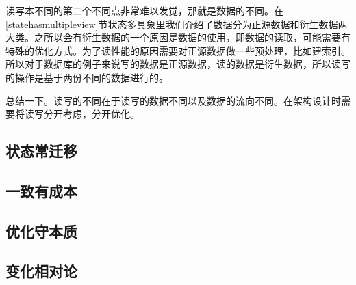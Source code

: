 读写本不同的第二个不同点非常难以发觉，那就是数据的不同。在\ref{statehasmultipleview}节状态多具象里我们介绍了数据分为正源数据和衍生数据两大类。之所以会有衍生数据的一个原因是数据的使用，即数据的读取，可能需要有特殊的优化方式。为了读性能的原因需要对正源数据做一些预处理，比如建索引。所以对于数据库的例子来说写的数据是正源数据，读的数据是衍生数据，所以读写的操作是基于两份不同的数据进行的。


总结一下。读写的不同在于读写的数据不同以及数据的流向不同。在架构设计时需要将读写分开考虑，分开优化。



\subsection{状态常迁移}

\subsection{一致有成本}

\subsection{优化守本质}


\subsection{变化相对论}

